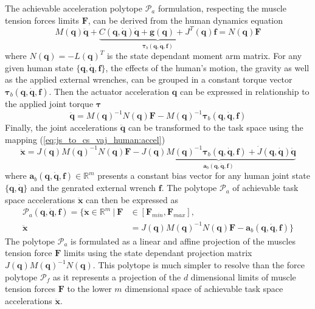 The achievable acceleration polytope $\mathcal{P}_a$ formulation, respecting the muscle tension forces limits $\bm{F}$, can be derived from the human dynamics equation
\begin{equation}
M(\bm{q})\ddot{\bm{q}} + \underbrace{C(\bm{q},\dot{\bm{q}})\dot{\bm{q}} + \bm{g}(\bm{q}) + J^T(\bm{q})\bm{f}}_{\bm{\tau}_b(\bm{q},\dot{\bm{q}}, \bm{f})} = N(\bm{q}) \bm{F} 
\end{equation}
where $N(\bm{q})=-L(\bm{q})^T$ is the state dependant moment arm matrix. 
For any given human state $\{\bm{q},\dot{\bm{q}}, \bm{f}\}$, the effects of the human's motion, the gravity as well as the applied external wrenches, can be grouped in a constant torque vector $\bm{\tau}_b(\bm{q},\dot{\bm{q}},\bm{f})$. Then the actuator acceleration $\bm{q}$ can be expressed in relationship to the applied joint torque $\bm{\tau}$
\begin{equation}
    \ddot{\bm{q}} = M(\bm{q})^{-1}N(\bm{q})\bm{F} - M(\bm{q})^{-1}\bm{\tau}_b(\bm{q},\dot{\bm{q}}, \bm{f})
\end{equation}
Finally, the joint accelerations $\ddot{\bm{q}}$ can be transformed to the task space using the mapping (\ref{eq:js_to_cs_vaj_human:accel})
\begin{equation}
    \ddot{\bm{x}} = J(\bm{q})M(\bm{q})^{-1}N(\bm{q})\bm{F} - \underbrace{J(\bm{q})M(\bm{q})^{-1}\bm{\tau}_b(\bm{q},\dot{\bm{q}},\bm{f}) + \dot{J}(\bm{q}, \dot{\bm{q}})\dot{\bm{q}}}_{\bm{a}_b(\bm{q},\dot{\bm{q}},\bm{f})}
\end{equation}
where $\bm{a}_b(\bm{q},\dot{\bm{q}},\bm{f}) \in \mathbb{R}^m$ presents a constant bias vector for any human joint state $\{\bm{q},\dot{\bm{q}}\}$ and the genrated external wrench $\bm{f}$. The polytope $\mathcal{P}_a$ of achievable task space accelerations $\ddot{\bm{x}}$ can then be expressed as
\begin{equation}
\begin{split}
    \mathcal{P}_a(\bm{q},\dot{\bm{q}},\bm{f}) = \{ \ddot{\bm{x}} \in \mathbb{R}^m ~|~ \bm{F}&\in\left[\bm{F}_{min}, \bm{F}_{max} \right],\\ \ddot{\bm{x}} &= J(\bm{q})M(\bm{q})^{-1}N(\bm{q})\bm{F} - \bm{a}_b(\bm{q},\dot{\bm{q}},\bm{f}) \}
\end{split}
\label{eq:poly_acceleration_hum}
\end{equation}
The polytope $\mathcal{P}_a$ is formulated as a linear and affine projection of the muscles tension force $\bm{F}$ limits using the state dependant projection matrix $J(\bm{q})M(\bm{q})^{-1}N(\bm{q})$.  This polytope is much simpler to resolve than the force polytope $\mathcal{P}_f$ as it represents a projection of the $d$ dimensional limits of muscle tension forces $\bm{F}$ to the lower $m$ dimensional space of achievable task space accelerations $\ddot{\bm{x}}$.

